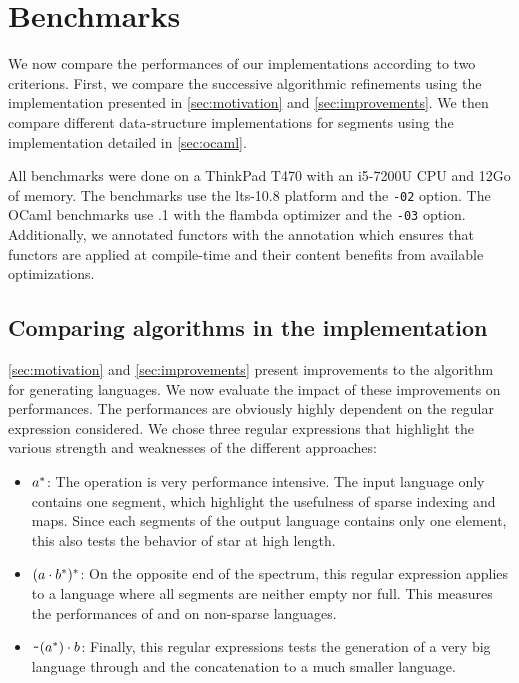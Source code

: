 \section{Benchmarks}
\label{sec:bench}

We now compare the performances of our implementations according to two criterions.
First, we compare the successive algorithmic refinements using the \haskell
implementation presented in \cref{sec:motivation} and \cref{sec:improvements}.
We then compare different data-structure implementations for segments
using the \ocaml implementation detailed in \cref{sec:ocaml}.

All benchmarks were done on a ThinkPad T470 with an i5-7200U CPU and 12Go of memory.
The \haskell benchmarks use the lts-10.8 platform and the \texttt{-02} option.
The OCaml benchmarks use .1 with the flambda optimizer and the
\texttt{-03} option. Additionally, we annotated functors
with the \code{[@inline]} annotation which ensures that functors are applied at
compile-time and their content benefits from available optimizations.

\subsection{Comparing algorithms in the \haskell implementation}

\cref{sec:motivation} and \cref{sec:improvements} present improvements to
the algorithm for generating languages. We now evaluate
the impact of these improvements on performances.
The performances are obviously highly dependent on the regular expression
considered. We chose three regular expressions that highlight
the various strength and weaknesses of the different approaches:
\begin{itemize}
\item$a^*$: The  operation is very performance intensive.
  The input language only contains one segment, which highlight the usefulness
  of sparse indexing and maps. Since each segments of the output language contains
  only one element, this also tests the behavior of star at high length.
\item $(a \cdot{b^*})^*$: On the opposite end of the spectrum, this
  regular expression applies  to a language where all segments
  are neither empty nor full. This measures the performances of 
  and  on non-sparse languages.
\item $\texttt{\textasciitilde}{(a^*)} \cdot{b}$: Finally, this regular expressions
  tests the generation of a very big language through  and the
  concatenation to a much smaller language.
\end{itemize}

